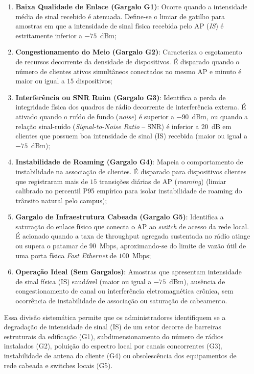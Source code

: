 \begin{enumerate}
	\item \textbf{Baixa Qualidade de Enlace (Gargalo G1)}: Ocorre quando a intensidade média de sinal recebido é atenuada. Define-se o limiar de gatilho para amostras em que a intensidade de sinal física recebida pelo AP (\textit{IS}) é estritamente inferior a $-75$~dBm;
	\item \textbf{Congestionamento do Meio (Gargalo G2)}: Caracteriza o esgotamento de recursos decorrente da densidade de dispositivos. É disparado quando o número de clientes ativos simultâneos conectados no mesmo AP e minuto é maior ou igual a $15$ dispositivos;
	\item \textbf{Interferência ou SNR Ruim (Gargalo G3)}: Identifica a perda de integridade física dos quadros de rádio decorrente de interferência externa. É ativado quando o ruído de fundo (\textit{noise}) é superior a $-90$~dBm, ou quando a relação sinal-ruído (\textit{Signal-to-Noise Ratio} -- SNR) é inferior a $20$~dB em clientes que possuem boa intensidade de sinal (IS) recebida (maior ou igual a $-75$~dBm);
	\item \textbf{Instabilidade de Roaming (Gargalo G4)}: Mapeia o comportamento de instabilidade na associação de clientes. É disparado para dispositivos clientes que registraram mais de $15$ transições diárias de AP (\textit{roaming}) (limiar calibrado no percentil P95 empírico para isolar instabilidade de roaming do trânsito natural pelo campus);
	\item \textbf{Gargalo de Infraestrutura Cabeada (Gargalo G5)}: Identifica a saturação do enlace físico que conecta o AP ao \textit{switch} de acesso da rede local. É acionado quando a taxa de throughput agregada sustentada no rádio atinge ou supera o patamar de $90$~Mbps, aproximando-se do limite de vazão útil de uma porta física \textit{Fast Ethernet} de $100$~Mbps;
	\item \textbf{Operação Ideal (Sem Gargalos)}: Amostras que apresentam intensidade de sinal física (IS) saudável (maior ou igual a $-75$~dBm), ausência de congestionamento de canal ou interferência eletromagnética crônica, sem ocorrência de instabilidade de associação ou saturação de cabeamento.
\end{enumerate}

Essa divisão sistemática permite que os administradores identifiquem se a degradação de intensidade de sinal (IS) de um setor decorre de barreiras estruturais da edificação (G1), subdimensionamento do número de rádios instalados (G2), poluição do espectro local por canais concorrentes (G3), instabilidade de antena do cliente (G4) ou obsolescência dos equipamentos de rede cabeada e switches locais (G5).

